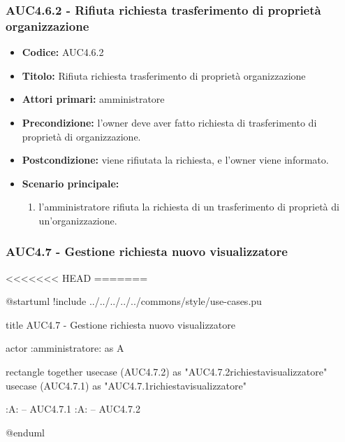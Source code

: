 \documentclass[casi-duso]{subfiles}
\begin{document}
\subsubsection{AUC4.6.2 - Rifiuta richiesta trasferimento di proprietà organizzazione}%
\label{subsub:AUC4.6.2}
\begin{itemize}
  \item \textbf{Codice:} AUC4.6.2
  \item \textbf{Titolo:} Rifiuta richiesta trasferimento di proprietà organizzazione
  \item \textbf{Attori primari:} amministratore
  \item \textbf{Precondizione:} l'owner deve aver fatto richiesta di trasferimento di proprietà di organizzazione.
  \item \textbf{Postcondizione:} viene rifiutata la richiesta, e l'owner viene informato.
  \item \textbf{Scenario principale:}
  \begin{enumerate}
    \item  l'amministratore rifiuta la richiesta di un trasferimento di proprietà di un'organizzazione.
  \end{enumerate}
\end{itemize}

\subsubsection{AUC4.7 - Gestione richiesta nuovo visualizzatore}%
\label{subsub:AUC4.7}
<<<<<<< HEAD
=======

\begin{plantuml}
@startuml
!include ../../../../../commons/style/use-cases.pu

title AUC4.7 - Gestione richiesta nuovo visualizzatore

actor :amministratore: as A

rectangle {
  together {
    usecase (AUC4.7.2) as "AUC4.7.2\nRifiuta richiesta\nnuovo visualizzatore"
    usecase (AUC4.7.1) as "AUC4.7.1\nAccetta richiesta\nnuovo visualizzatore"
  }
}

:A: -- AUC4.7.1
:A: -- AUC4.7.2

@enduml
\end{plantuml}
\end{document}
